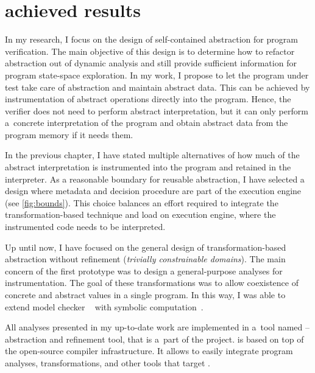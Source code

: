 \chapter{achieved results}
\label{ch:results}


In my research, I focus on the design of self-contained abstraction for program
verification. The main objective of this design is to determine how to refactor
abstraction out of dynamic analysis and still provide sufficient information
for program state-space exploration. In my work, I propose to let the program
under test take care of abstraction and maintain abstract data. This can be
achieved by instrumentation of abstract operations directly into the program.
Hence, the verifier does not need to perform abstract interpretation, but it
can only perform a~concrete interpretation of the program and obtain abstract
data from the program memory if it needs them.

In the previous chapter, I have stated multiple alternatives of how much of the
abstract interpretation is instrumented into the program and retained in the
interpreter.  As a reasonable boundary for reusable abstraction, I have
selected a design where metadata and decision procedure are part of the
execution engine (see \autoref{fig:bounds}). This choice balances an effort
required to integrate the transformation-based technique and load on execution
engine, where the instrumented code needs to be interpreted.

Up until now, I have focused on the general design of trans\-for\-mation-based
abstraction without refinement (\emph{trivially constrainable domains}). The
main concern of the first prototype was to design a general-purpose analyses
for instrumentation. The goal of these transformations was to allow coexistence
of concrete and abstract values in a single program. In this way, I was able to
extend model checker \divine~\cite{Divine17} with symbolic
computation~\cite{Lauko2019Sym, Lauko2018SymComp}.

All analyses presented in my up-to-date work are implemented in a~tool named
\lart{} -- \llvm abstraction and refinement tool, that is a~part of the \divine
project. \lart is based on top of the open-source \llvm compiler
infrastructure. It allows \lart to easily integrate program analyses,
transformations, and other tools that target \llvm.


\newpage

